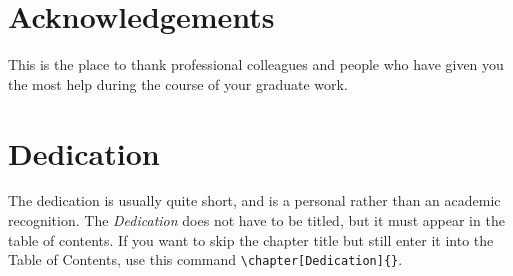 \chapter{Acknowledgements}      %
This is the place to thank professional colleagues and people who have
given you the most help during the course of your graduate work.

\chapter{Dedication} %
The dedication is usually quite short, and is a personal rather than
an academic recognition.  The \emph{Dedication} does not have to be
titled, but it must appear in the table of contents.  If you want to
skip the chapter title but still enter it into the Table of Contents,
use this command \verb|\chapter[Dedication]{}|.
